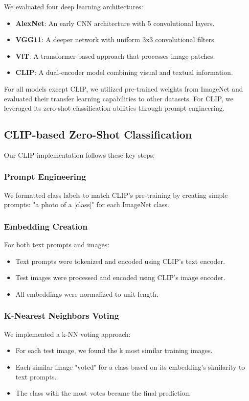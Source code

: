 \documentclass[9pt,a4paper,twocolumn,twoside]{tau-class/tau}
\begin{document}
We evaluated four deep learning architectures:
\begin{itemize}
    \item \textbf{AlexNet}: An early CNN architecture with 5 convolutional layers.
    \item \textbf{VGG11}: A deeper network with uniform 3x3 convolutional filters.
    \item \textbf{ViT}: A transformer-based approach that processes image patches.
    \item \textbf{CLIP}: A dual-encoder model combining visual and textual information.
\end{itemize}

For all models except CLIP, we utilized pre-trained weights from ImageNet and evaluated their transfer learning capabilities to other datasets. For CLIP, we leveraged its zero-shot classification abilities through prompt engineering.

\subsection{CLIP-based Zero-Shot Classification}

Our CLIP implementation follows these key steps:

\subsubsection{Prompt Engineering}
We formatted class labels to match CLIP's pre-training by creating simple prompts: "a photo of a [class]" for each ImageNet class.

\subsubsection{Embedding Creation}
For both text prompts and images:
\begin{itemize}
    \item Text prompts were tokenized and encoded using CLIP's text encoder.
    \item Test images were processed and encoded using CLIP's image encoder.
    \item All embeddings were normalized to unit length.
\end{itemize}

\subsubsection{K-Nearest Neighbors Voting}
We implemented a k-NN voting approach:
\begin{itemize}
    \item For each test image, we found the k most similar training images.
    \item Each similar image "voted" for a class based on its embedding's similarity to text prompts.
    \item The class with the most votes became the final prediction.
\end{itemize}
\end{document}
